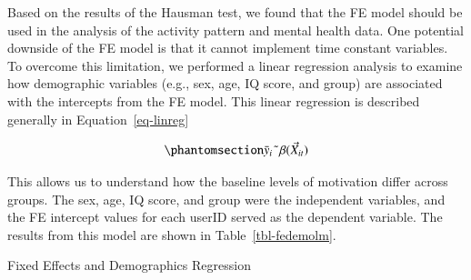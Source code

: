 \documentclass[
  letterpaper,
  number,
  review,
  3p]{elsarticle}
\begin{document}
Based on the results of the Hausman test, we found that the FE model
should be used in the analysis of the activity pattern and mental health
data. One potential downside of the FE model is that it cannot implement
time constant variables. To overcome this limitation, we performed a
linear regression analysis to examine how demographic variables (e.g.,
sex, age, IQ score, and group) are associated with the intercepts from
the FE model. This linear regression is described generally in
Equation~\ref{eq-linreg}

\begin{equation}\phantomsection\label{eq-linreg}{
\bar{y}_{i} \; \tilde{} \; \beta (\vec{X}_{it})
}\end{equation}

This allows us to understand how the baseline levels of motivation
differ across groups. The sex, age, IQ score, and group were the
independent variables, and the FE intercept values for each userID
served as the dependent variable. The results from this model are shown
in Table~\ref{tbl-fedemolm}.

\begin{table}

\caption{\label{tbl-fedemolm}Fixed Effects and Demographics Regression}


\end{table}%
\end{document}
